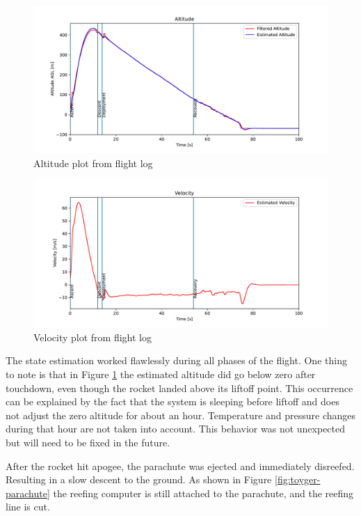 \begin{figure}[h!]
	\centering
	\includegraphics[width=\textwidth]{plots/argos-altitude}
	\caption{Altitude plot from flight log}
	\label{fig:argos-altitude}
\end{figure}

\begin{figure}[h!]
	\centering
	\includegraphics[width=\textwidth]{plots/argos-velocity}
	\caption{Velocity plot from flight log}
	\label{fig:argos-velocity}
\end{figure}

The state estimation worked flawlessly during all phases of the flight. One thing to note is that in Figure \ref{fig:argos-altitude} the estimated altitude did go below zero after touchdown, even though the rocket landed above its liftoff point. This occurrence can be explained by the fact that the system is sleeping before liftoff and does not adjust the zero altitude for about an hour. Temperature and pressure changes during that hour are not taken into account. This behavior was not unexpected but will need to be fixed in the future.  

After the rocket hit apogee, the parachute was ejected and immediately disreefed. Resulting in a slow descent to the ground. As shown in Figure \ref{fig:toyger-parachute} the reefing computer is still attached to the parachute, and the reefing line is cut.

